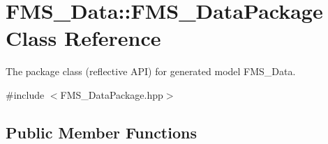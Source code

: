 \hypertarget{classFMS__Data_1_1FMS__DataPackage}{
\section{FMS\_\-Data::FMS\_\-DataPackage Class Reference}
\label{classFMS__Data_1_1FMS__DataPackage}
}


The package class (reflective API) for generated model FMS\_\-Data.  




{\ttfamily \#include $<$FMS\_\-DataPackage.hpp$>$}

\subsection*{Public Member Functions}

